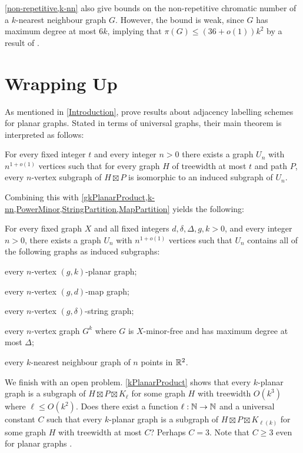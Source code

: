 \documentclass{patmorin}
\renewcommand{\geq}{\geqslant}
\renewcommand{\leq}{\leqslant}
\begin{document}
\cref{non-repetitive,k-nn} also give bounds on the non-repetitive chromatic number of a $k$-nearest neighbour graph $G$. However, the bound is weak, since $G$ has maximum degree at most $6k$, implying that $\pi(G) \leq (36+o(1))k^2$ by a result of \citet{DJKW16}.

\section{Wrapping Up}


As mentioned in \cref{Introduction}, \citet{DEJGMM21} prove results about adjacency labelling schemes for planar graphs. Stated in terms of universal graphs, their main theorem is interpreted as follows:

\begin{thm}
	\label{Universal}
	For every fixed integer $t$ and every integer $n>0$ there exists a
	graph $U_n$ with $n^{1+o(1)}$ vertices such that for every graph $H$ of
	treewidth at most $t$ and path $P$, every $n$-vertex subgraph of $H\boxtimes P$ is isomorphic to an induced subgraph of $U_n$.
\end{thm}

Combining this with \cref{gkPlanarProduct,k-nn,PowerMinor,StringPartition,MapPartition} yields the following:

\begin{thm}
	\label{UniversalUniversal}
	For every fixed graph $X$ and all fixed integers $d,\delta,\Delta,g,k>0$, and every integer
	$n>0$, there exists a graph $U_n$ with $n^{1+o(1)}$ vertices such that
	$U_n$ contains all of the following graphs as induced subgraphs:
	\begin{compactitem}
		\item every $n$-vertex $(g,k)$-planar graph;
		\item every $n$-vertex $(g,d)$-map graph;
		\item every $n$-vertex $(g,\delta)$-string graph;
		\item every $n$-vertex graph $G^k$ where $G$ is $X$-minor-free and has maximum degree at most $\Delta$;
		\item every $k$-nearest neighbour graph of $n$ points in $\mathbb{R}^2$.
	\end{compactitem}
\end{thm}

We finish with an open problem. \cref{kPlanarProduct} shows that every $k$-planar graph is a subgraph of $H\boxtimes P \boxtimes K_\ell$ for some graph $H$ with treewidth $O(k^3)$ where $\ell\leq O(k^2)$. Does there exist a function $\ell:\mathbb{N}\to\mathbb{N}$ and a universal constant $C$ such that every $k$-planar graph is a subgraph of $H\boxtimes P \boxtimes K_{\ell(k)}$ for some graph $H$ with treewidth at most $C$?  Perhaps $C=3$. Note that $C\geq 3$ even for planar graphs \citep{DJMMUW20}.
\end{document}
